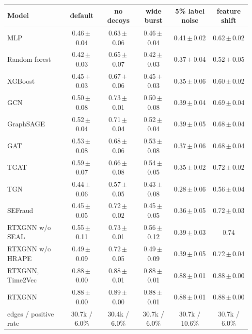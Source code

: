 \begin{tabular}{lccccc}
\toprule
Model & default & no decoys & wide burst & 5\% label noise & feature shift\\
\midrule
MLP & 0.46\,$\pm$\,0.04 & 0.63\,$\pm$\,0.06 & 0.46\,$\pm$\,0.04 & 0.41\,$\pm$\,0.02 & 0.62\,$\pm$\,0.02\\
Random forest & 0.42\,$\pm$\,0.03 & 0.65\,$\pm$\,0.07 & 0.42\,$\pm$\,0.03 & 0.37\,$\pm$\,0.04 & 0.52\,$\pm$\,0.05\\
XGBoost & 0.45\,$\pm$\,0.03 & 0.67\,$\pm$\,0.06 & 0.45\,$\pm$\,0.03 & 0.35\,$\pm$\,0.06 & 0.60\,$\pm$\,0.02\\
GCN & 0.50\,$\pm$\,0.08 & 0.73\,$\pm$\,0.01 & 0.50\,$\pm$\,0.08 & 0.39\,$\pm$\,0.04 & 0.69\,$\pm$\,0.04\\
GraphSAGE & 0.52\,$\pm$\,0.04 & 0.71\,$\pm$\,0.04 & 0.52\,$\pm$\,0.04 & 0.39\,$\pm$\,0.05 & 0.68\,$\pm$\,0.04\\
GAT & 0.53\,$\pm$\,0.08 & 0.68\,$\pm$\,0.06 & 0.53\,$\pm$\,0.08 & 0.37\,$\pm$\,0.06 & 0.68\,$\pm$\,0.04\\
TGAT & 0.59\,$\pm$\,0.07 & 0.66\,$\pm$\,0.08 & 0.54\,$\pm$\,0.05 & 0.35\,$\pm$\,0.02 & 0.72\,$\pm$\,0.02\\
TGN & 0.44\,$\pm$\,0.06 & 0.57\,$\pm$\,0.05 & 0.43\,$\pm$\,0.08 & 0.28\,$\pm$\,0.06 & 0.56\,$\pm$\,0.04\\
SEFraud & 0.45\,$\pm$\,0.05 & 0.72\,$\pm$\,0.02 & 0.45\,$\pm$\,0.05 & 0.36\,$\pm$\,0.05 & 0.72\,$\pm$\,0.03\\
RTXGNN w/o SEAL & 0.55\,$\pm$\,0.11 & 0.73\,$\pm$\,0.01 & 0.56\,$\pm$\,0.12 & 0.39\,$\pm$\,0.03 & 0.74\\
RTXGNN w/o HRAPE & 0.49\,$\pm$\,0.09 & 0.72\,$\pm$\,0.05 & 0.49\,$\pm$\,0.09 & 0.39\,$\pm$\,0.05 & 0.72\,$\pm$\,0.04\\
RTXGNN, Time2Vec & 0.88\,$\pm$\,0.00 & 0.88\,$\pm$\,0.01 & 0.88\,$\pm$\,0.01 & 0.88\,$\pm$\,0.01 & 0.88\,$\pm$\,0.00\\
RTXGNN & 0.88\,$\pm$\,0.00 & 0.89\,$\pm$\,0.00 & 0.88\,$\pm$\,0.01 & 0.88\,$\pm$\,0.01 & 0.88\,$\pm$\,0.00\\
\midrule
edges / positive rate & 30.7k / 6.0\% & 30.4k / 6.0\% & 30.7k / 6.0\% & 30.7k / 10.6\% & 30.7k / 6.0\%\\
\bottomrule
\end{tabular}
